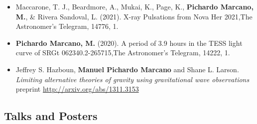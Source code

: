 \documentclass[letterpaper,10pt]{article}
\begin{document}
\begin{itemize}[label=$\blacktriangleright$]
\item Maccarone, T. J., Beardmore, A., Mukai, K., Page, K., \textbf{Pichardo Marcano, M.}, \& Rivera Sandoval, L. (2021). X-ray Pulsations from Nova Her 2021,The Astronomer's Telegram, 14776, 1.



\item \textbf{Pichardo Marcano, M.} (2020). A period of 3.9 hours in the TESS light curve of SRGt 062340.2-265715,The Astronomer's Telegram, 14222, 1.

\item  Jeffrey S. Hazboun, \textbf{Manuel Pichardo Marcano} and Shane L. Larson. \emph{Limiting alternative theories of gravity using gravitational wave observations} \\
 preprint \url{http://arxiv.org/abs/1311.3153} \\


\end{itemize}

\subsection*{Talks and Posters}
\end{document}
